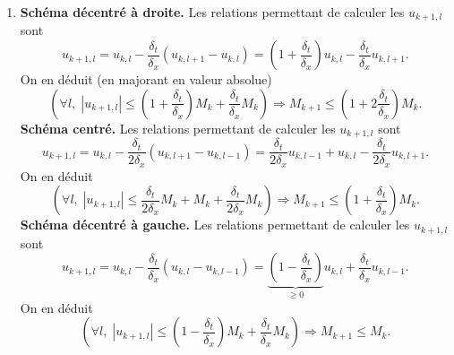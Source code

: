 \begin{enumerate}
 \item 
 \textbf{Schéma décentré à droite.} 
Les relations permettant de calculer les $u_{k+1,l}$ sont
\[
 u_{k+1,l} = u_{k,l} - \frac{\delta_t}{\delta_x}\left( u_{k,l+1} - u_{k,l}\right) 
 = \left( 1+\frac{\delta_t}{\delta_x}\right)u_{k,l} -  \frac{\delta_t}{\delta_x} u_{k,l+1}.
\]
On en déduit (en majorant en valeur absolue)
\[
 \left( \forall l, \; |u_{k+1,l}|\leq \left( 1+\frac{\delta_t}{\delta_x}\right)M_k +  \frac{\delta_t}{\delta_x} M_k\right) 
 \Rightarrow M_{k+1} \leq \left( 1 + 2\frac{\delta_t}{\delta_x}\right)M_k.
\]
 \textbf{Schéma centré.}
Les relations permettant de calculer les $u_{k+1,l}$ sont
\[
 u_{k+1,l} = u_{k,l} - \frac{\delta_t}{2\delta_x}\left( u_{k,l+1} - u_{k,l-1}\right) 
 = \frac{\delta_t}{2\delta_x}u_{k,l-1} + u_{k,l} - \frac{\delta_t}{2\delta_x}u_{k,l+1}.
\]
On en déduit
\[
 \left( \forall l, \; |u_{k+1,l}|\leq \frac{\delta_t}{2\delta_x} M_k + M_k + \frac{\delta_t}{2\delta_x}M_k\right) 
 \Rightarrow M_{k+1} \leq \left(1 + \frac{\delta_t}{\delta_x}\right)M_k.
\]
 \textbf{Schéma décentré à gauche.}
Les relations permettant de calculer les $u_{k+1,l}$ sont
\[
 u_{k+1,l} = u_{k,l} - \frac{\delta_t}{\delta_x}\left( u_{k,l} - u_{k,l-1}\right) 
 = \underset{\geq 0}{\underbrace{\left( 1 - \frac{\delta_t}{\delta_x}\right)}}u_{k,l} + \frac{\delta_t}{\delta_x}u_{k,l-1}. 
\]
On en déduit 
\[
 \left( \forall l, \; |u_{k+1,l}|\leq \left( 1-\frac{\delta_t}{\delta_x}\right)M_k +  \frac{\delta_t}{\delta_x} M_k\right) 
 \Rightarrow M_{k+1} \leq M_k.
\]

\end{enumerate}
